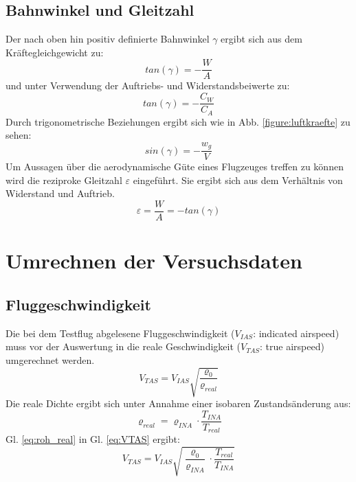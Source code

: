 \subsection{Bahnwinkel und Gleitzahl}
Der nach oben hin positiv definierte Bahnwinkel $\gamma$ ergibt sich aus dem Kräftegleichgewicht zu:
\begin{equation}
tan(\gamma)=-\frac{W}{A}
\end{equation}
und unter Verwendung der Auftriebs- und Widerstandsbeiwerte zu:
\begin{equation}
tan(\gamma)=-\frac{C_W}{C_A}
\end{equation}
Durch trigonometrische Beziehungen ergibt sich wie in Abb. \ref{figure:luftkraefte} zu sehen:
\begin{equation}
\label{eq:bahnneigungswinkel}
sin(\gamma) = -\frac{w_g}{V}
\end{equation}
%
%
%
%
Um Aussagen über die aerodynamische Güte eines Flugzeuges treffen zu können wird die reziproke Gleitzahl $\varepsilon$ eingeführt. Sie ergibt sich aus dem Verhältnis von Widerstand und Auftrieb.
\begin{equation}
\varepsilon=\frac{W}{A}=-tan(\gamma)
\end{equation}
%

\section{Umrechnen der Versuchsdaten}
\subsection{Fluggeschwindigkeit}
Die bei dem Testflug abgelesene Fluggeschwindigkeit ($V_{IAS}$: indicated airspeed) muss vor der Auswertung in die reale Geschwindigkeit ($V_{TAS}$: true airspeed) umgerechnet werden.
\begin{equation} \label{eq:VTAS}
V_{TAS}=V_{IAS} \sqrt{\frac{\varrho_0}{\varrho_{real}}}
\end{equation} 
Die reale Dichte ergibt sich unter Annahme einer isobaren Zustandsänderung aus:
\begin{equation} \label{eq:roh_real}
\varrho_{real} = \varrho_{INA}  \cdot  \frac{T_{INA}}{T_{real}}
\end{equation}
Gl. \ref{eq:roh_real} in Gl. \ref{eq:VTAS} ergibt:
\begin{equation}
V_{TAS}=V_{IAS} \sqrt{\frac{\varrho_0}{\varrho_{INA}} \cdot \frac{T_{real}}{T_{INA}}}
\end{equation}
%
\vspace{10mm}
